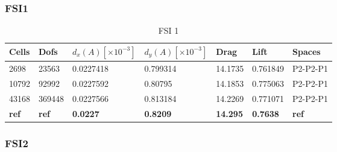 \subsubsection*{FSI1}
\begin{table}[H]
\centering
\caption{FSI 1}
\label{my-label}
\begin{tabular}{|l|l|l|l|l|l|l|}
\hline
Cells & Dofs & $d_x(A) [\times10^{-3}]$ & $d_y(A)[\times10^{-3}]$ & Drag & Lift & Spaces \\ \hline
2698 & 23563 &0.0227418 &0.799314  &  14.1735 &0.761849 & P2-P2-P1 \\ \hline
10792 & 92992  &0.0227592 & 0.80795 & 14.1853 &  0.775063 &  P2-P2-P1 \\ \hline
43168 & 369448 & 0.0227566 & 0.813184 & 14.2269 & 0.771071 & P2-P2-P1 \\ \hline
\textbf{ref} & \textbf{ref} & \textbf{0.0227} & \textbf{0.8209} & \textbf{14.295} & \textbf{0.7638} & \textbf{ref} \\ \hline
\end{tabular}
\end{table}

\subsubsection*{FSI2}

